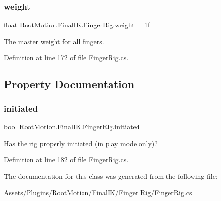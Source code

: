 \subsubsection{\texorpdfstring{weight}{weight}}
{\footnotesize\ttfamily float Root\+Motion.\+Final\+I\+K.\+Finger\+Rig.\+weight = 1f}



The master weight for all fingers. 



Definition at line 172 of file Finger\+Rig.\+cs.



\subsection{Property Documentation}
\mbox{\label{class_root_motion_1_1_final_i_k_1_1_finger_rig_a92bf1c8610eef3e8f5f7ee1d13d4460a}} 
\subsubsection{\texorpdfstring{initiated}{initiated}}
{\footnotesize\ttfamily bool Root\+Motion.\+Final\+I\+K.\+Finger\+Rig.\+initiated\hspace{0.3cm}{\ttfamily [get]}}



Has the rig properly initiated (in play mode only)? 



Definition at line 182 of file Finger\+Rig.\+cs.



The documentation for this class was generated from the following file\+:\begin{DoxyCompactItemize}
\item 
Assets/\+Plugins/\+Root\+Motion/\+Final\+I\+K/\+Finger Rig/\mbox{\hyperlink{_finger_rig_8cs}{Finger\+Rig.\+cs}}\end{DoxyCompactItemize}
